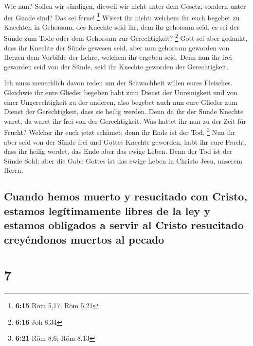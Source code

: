  Wie nun? Sollen wir sündigen, dieweil wir nicht unter
dem Gesetz, sondern unter der Gnade sind? Das sei ferne! \footnote{\textbf{6:15}
  Röm 5,17; Röm 5,21}  Wisset ihr nicht: welchem ihr euch
begebet zu Knechten in Gehorsam, des Knechte seid ihr, dem ihr gehorsam
seid, es sei der Sünde zum Tode oder dem Gehorsam zur Gerechtigkeit?
\footnote{\textbf{6:16} Joh 8,34}  Gott sei aber gedankt,
dass ihr Knechte der Sünde gewesen seid, aber nun gehorsam geworden von
Herzen dem Vorbilde der Lehre, welchem ihr ergeben seid. 
Denn nun ihr frei geworden seid von der Sünde, seid ihr Knechte geworden
der Gerechtigkeit.

 Ich muss menschlich davon reden um der Schwachheit
willen eures Fleisches. Gleichwie ihr eure Glieder begeben habt zum
Dienst der Unreinigkeit und von einer Ungerechtigkeit zu der anderen,
also begebet auch nun eure Glieder zum Dienst der Gerechtigkeit, dass
sie heilig werden.  Denn da ihr der Sünde Knechte waret,
da waret ihr frei von der Gerechtigkeit.  Was hattet ihr
nun zu der Zeit für Frucht? Welcher ihr euch jetzt schämet; denn ihr
Ende ist der Tod. \footnote{\textbf{6:21} Röm 8,6; Röm 8,13}
 Nun ihr aber seid von der Sünde frei und Gottes Knechte
geworden, habt ihr eure Frucht, dass ihr heilig werdet, das Ende aber
das ewige Leben.  Denn der Tod ist der Sünde Sold; aber
die Gabe Gottes ist das ewige Leben in Christo Jesu, unserem Herrn.

\hypertarget{cuando-hemos-muerto-y-resucitado-con-cristo-estamos-leguxedtimamente-libres-de-la-ley-y-estamos-obligados-a-servir-al-cristo-resucitado-creyuxe9ndonos-muertos-al-pecado}{%
\subsection{Cuando hemos muerto y resucitado con Cristo, estamos
legítimamente libres de la ley y estamos obligados a servir al Cristo
resucitado creyéndonos muertos al
pecado}\label{cuando-hemos-muerto-y-resucitado-con-cristo-estamos-leguxedtimamente-libres-de-la-ley-y-estamos-obligados-a-servir-al-cristo-resucitado-creyuxe9ndonos-muertos-al-pecado}}

\hypertarget{section-6}{%
\section{7}\label{section-6}}

